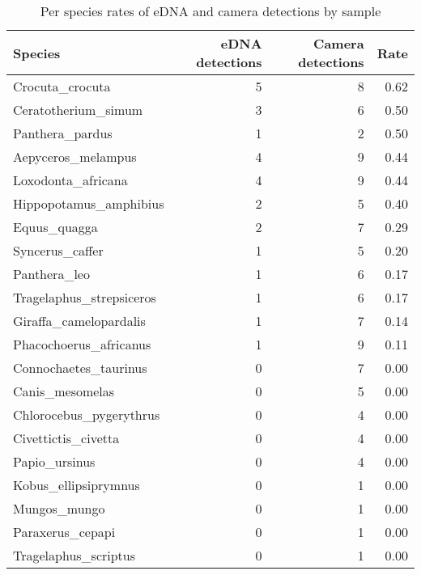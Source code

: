 \begin{table}[ht]
\centering
\begin{tabular}{lrrr}
  \hline
Species & eDNA detections & Camera detections & Rate \\ 
  \hline
Crocuta\_crocuta & 5 & 8 & 0.62 \\ 
  Ceratotherium\_simum & 3 & 6 & 0.50 \\ 
  Panthera\_pardus & 1 & 2 & 0.50 \\ 
  Aepyceros\_melampus & 4 & 9 & 0.44 \\ 
  Loxodonta\_africana & 4 & 9 & 0.44 \\ 
  Hippopotamus\_amphibius & 2 & 5 & 0.40 \\ 
  Equus\_quagga & 2 & 7 & 0.29 \\ 
  Syncerus\_caffer & 1 & 5 & 0.20 \\ 
  Panthera\_leo & 1 & 6 & 0.17 \\ 
  Tragelaphus\_strepsiceros & 1 & 6 & 0.17 \\ 
  Giraffa\_camelopardalis & 1 & 7 & 0.14 \\ 
  Phacochoerus\_africanus & 1 & 9 & 0.11 \\ 
  Connochaetes\_taurinus & 0 & 7 & 0.00 \\ 
  Canis\_mesomelas & 0 & 5 & 0.00 \\ 
  Chlorocebus\_pygerythrus & 0 & 4 & 0.00 \\ 
  Civettictis\_civetta & 0 & 4 & 0.00 \\ 
  Papio\_ursinus & 0 & 4 & 0.00 \\ 
  Kobus\_ellipsiprymnus & 0 & 1 & 0.00 \\ 
  Mungos\_mungo & 0 & 1 & 0.00 \\ 
  Paraxerus\_cepapi & 0 & 1 & 0.00 \\ 
  Tragelaphus\_scriptus & 0 & 1 & 0.00 \\ 
   \hline
\end{tabular}
\caption{Per species rates of eDNA and camera detections by sample} 
\end{table}

